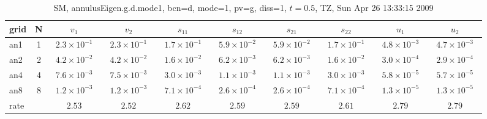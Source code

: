 \begin{table}[hbt]\tableFont %
\begin{center}
\begin{tabular}{|l|c|c|c|c|c|c|c|c|c|} \hline\hline 
grid  & N  & $v_1$ & $v_2$ & $s_{11}$ & $s_{12}$ & $s_{21}$ & $s_{22}$ &  $u_1$ & $u_2$\\ \hline 
                 an1 &     1 & ~$2.3\times10^{ -1}$~ & ~$2.3\times10^{ -1}$~ & ~$1.7\times10^{ -1}$~ & ~$5.9\times10^{ -2}$~ & ~$5.9\times10^{ -2}$~ & ~$1.7\times10^{ -1}$~ & ~$4.8\times10^{ -3}$~ & ~$4.7\times10^{ -3}$~  \\ \hline
                 an2 &     2 & ~$4.2\times10^{ -2}$~ & ~$4.2\times10^{ -2}$~ & ~$1.6\times10^{ -2}$~ & ~$6.2\times10^{ -3}$~ & ~$6.2\times10^{ -3}$~ & ~$1.6\times10^{ -2}$~ & ~$3.0\times10^{ -4}$~ & ~$2.9\times10^{ -4}$~  \\ \hline
                 an4 &     4 & ~$7.6\times10^{ -3}$~ & ~$7.5\times10^{ -3}$~ & ~$3.0\times10^{ -3}$~ & ~$1.1\times10^{ -3}$~ & ~$1.1\times10^{ -3}$~ & ~$3.0\times10^{ -3}$~ & ~$5.8\times10^{ -5}$~ & ~$5.7\times10^{ -5}$~  \\ \hline
                 an8 &     8 & ~$1.2\times10^{ -3}$~ & ~$1.2\times10^{ -3}$~ & ~$7.1\times10^{ -4}$~ & ~$2.6\times10^{ -4}$~ & ~$2.6\times10^{ -4}$~ & ~$7.1\times10^{ -4}$~ & ~$1.3\times10^{ -5}$~ & ~$1.3\times10^{ -5}$~  \\ \hline
    rate             &       &       $2.53$          &       $2.52$          &       $2.62$          &       $2.59$          &       $2.59$          &       $2.61$          &       $2.79$          &       $2.79$           \\ \hline\hline
\end{tabular}
\caption{SM, annulusEigen.g.d.mode1, bcn=d, mode=1, pv=g, diss=1, $t=0.5$,  TZ, Sun Apr 26 13:33:15 2009}\label{table:annulusEigen.g.d.mode1}
\end{center}
\end{table}
